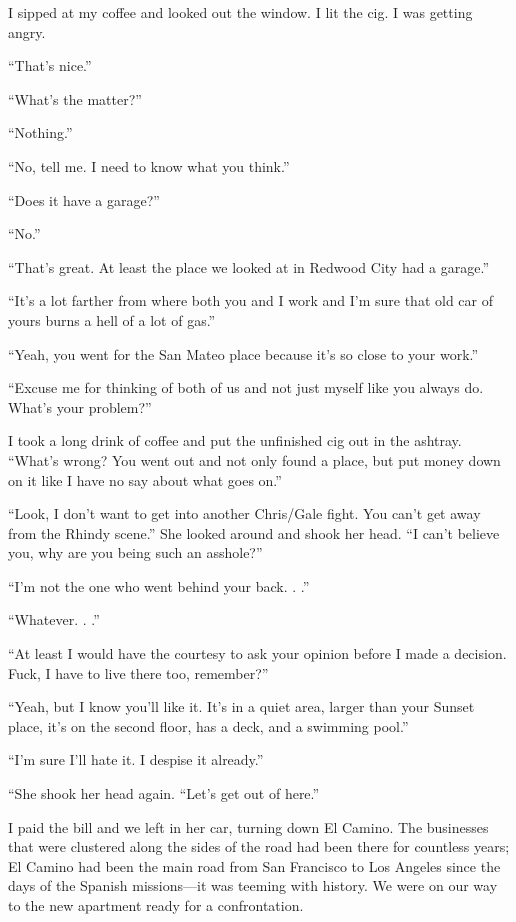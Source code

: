 I sipped at my coffee and looked out the window. I lit the cig. I was
getting angry.

``That's nice.''

``What's the matter?''

``Nothing.''

``No, tell me. I need to know what you think.''

``Does it have a garage?''

``No.''

``That's great. At least the place we looked at in Redwood City had a
garage.''

``It's a lot farther from where both you and I work and I'm sure that
old car of yours burns a hell of a lot of gas.''

``Yeah, you went for the San Mateo place because it's so close to your
work.''

``Excuse me for thinking of both of us and not just myself like you
always do. What's your problem?''

I took a long drink of coffee and put the unfinished cig out in the
ashtray. ``What's wrong? You went out and not only found a place, but
put money down on it like I have no say about what goes on.''

``Look, I don't want to get into another Chris/Gale fight. You can't get
away from the Rhindy scene.'' She looked around and shook her head. ``I
can't believe you, why are you being such an asshole?''

``I'm not the one who went behind your back. . .''

``Whatever. . .''

``At least I would have the courtesy to ask your opinion before I made a
decision. Fuck, I have to live there too, remember?''

``Yeah, but I know you'll like it. It's in a quiet area, larger than
your Sunset place, it's on the second floor, has a deck, and a swimming
pool.''

``I'm sure I'll hate it. I despise it already.''

``She shook her head again. ``Let's get out of here.''

I paid the bill and we left in her car, turning down El Camino. The
businesses that were clustered along the sides of the road had been
there for countless years; El Camino had been the main road from San
Francisco to Los Angeles since the days of the Spanish missions---it was
teeming with history. We were on our way to the new apartment ready for
a confrontation.


